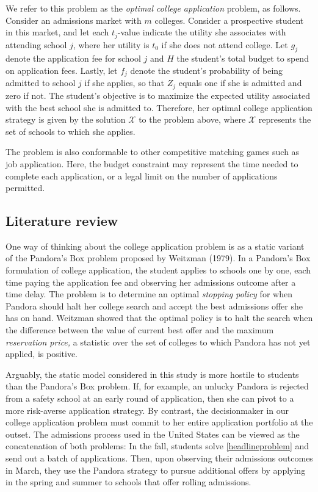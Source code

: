 \documentclass[11pt]{article} %
\theoremstyle{definition}
\begin{document}
We refer to this problem as the \emph{optimal college application} problem, as follows. Consider an admissions market with $m$ colleges. Consider a prospective student in this market, and let each $t_j$-value indicate the utility she associates with attending school $j$, where her utility is $t_0$ if she does not attend college. Let $g_j$ denote the application fee for school $j$ and $H$ the student's total budget to spend on application fees. Lastly, let $f_j$ denote the student's probability of being admitted to school $j$ if she applies, so that $Z_j$ equals one if she is admitted and zero if not. The student's objective is to maximize the expected utility associated with the best school she is admitted to. Therefore, her optimal college application strategy is given by the solution $\mathcal{X}$ to the problem above, where $\mathcal{X}$ represents the set of schools to which she applies. 

The problem is also conformable to other competitive matching games such as job application. Here, the budget constraint may represent the time needed to complete each application, or a legal limit on the number of applications permitted.

\subsection{Literature review}
One way of thinking about the college application problem is as a static variant of the Pandora's Box problem proposed by Weitzman (1979). In a Pandora's Box formulation of college application, the student applies to schools one by one, each time paying the application fee and observing her admissions outcome after a time delay. The problem is to determine an optimal \emph{stopping policy} for when Pandora should halt her college search and accept the best admissions offer she has on hand. Weitzman showed that the optimal policy is to halt the search when the difference between the value of current best offer and the maximum \emph{reservation price,} a statistic over the set of colleges to which Pandora has not yet applied, is positive.

Arguably, the static model considered in this study is more hostile to students than the Pandora's Box problem. If, for example, an unlucky Pandora is rejected from a safety school at an early round of application, then she can pivot to a more risk-averse application strategy. By contrast, the decisionmaker in our college application problem must commit to her entire application portfolio at the outset. The admissions process used in the United States can be viewed as the concatenation of both problems: In the fall, students solve \eqref{headlineproblem} and send out a batch of applications. Then, upon observing their admissions outcomes in March, they use the Pandora strategy to pursue additional offers by applying in the spring and summer to schools that offer rolling admissions.
\end{document}

